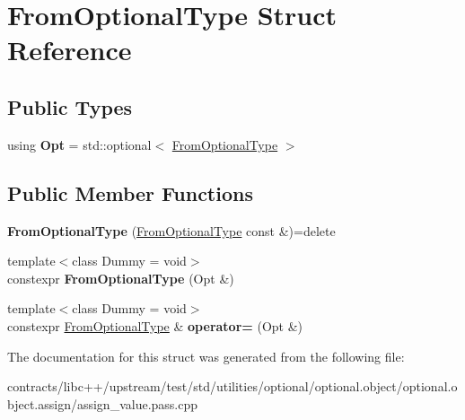 \hypertarget{struct_from_optional_type}{}\section{From\+Optional\+Type Struct Reference}
\label{struct_from_optional_type}
\subsection*{Public Types}
\begin{DoxyCompactItemize}
\item 
\mbox{\label{struct_from_optional_type_afe394a08a963a80ee4f9a34b05b7db68}} 
using {\bfseries Opt} = std\+::optional$<$ \mbox{\hyperlink{struct_from_optional_type}{From\+Optional\+Type}} $>$
\end{DoxyCompactItemize}
\subsection*{Public Member Functions}
\begin{DoxyCompactItemize}
\item 
\mbox{\label{struct_from_optional_type_a5454a67b0857596b86a2a61c3bfb2982}} 
{\bfseries From\+Optional\+Type} (\mbox{\hyperlink{struct_from_optional_type}{From\+Optional\+Type}} const \&)=delete
\item 
\mbox{\label{struct_from_optional_type_adf97c60cb4461c5ccae1f102c2ed1f9a}} 
{\footnotesize template$<$class Dummy  = void$>$ }\\constexpr {\bfseries From\+Optional\+Type} (Opt \&)
\item 
\mbox{\label{struct_from_optional_type_a4ea1a86dc3e1cb853f013e917f1ca83f}} 
{\footnotesize template$<$class Dummy  = void$>$ }\\constexpr \mbox{\hyperlink{struct_from_optional_type}{From\+Optional\+Type}} \& {\bfseries operator=} (Opt \&)
\end{DoxyCompactItemize}


The documentation for this struct was generated from the following file\+:\begin{DoxyCompactItemize}
\item 
contracts/libc++/upstream/test/std/utilities/optional/optional.\+object/optional.\+object.\+assign/assign\+\_\+value.\+pass.\+cpp\end{DoxyCompactItemize}

